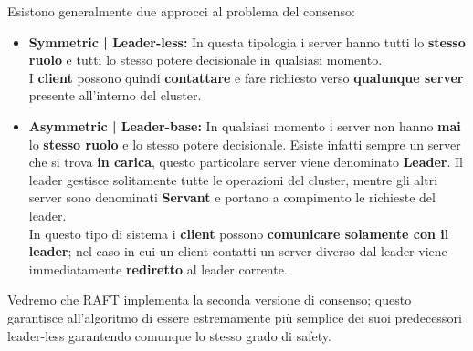 Esistono generalmente due approcci al problema del consenso:
\begin{itemize}
  \item{\textbf{Symmetric | Leader-less:}}
  In questa tipologia i server hanno tutti lo \textbf{stesso ruolo} e tutti lo stesso potere decisionale in qualsiasi momento.\\
  I \textbf{client} possono quindi \textbf{contattare} e fare richiesto verso \textbf{qualunque server} presente all'interno del cluster. 
  \item{\textbf{Asymmetric | Leader-base:}}
  In qualsiasi momento i server non hanno \textbf{mai} lo \textbf{stesso ruolo} e lo stesso potere decisionale. Esiste infatti sempre un server che si trova \textbf{in carica}, questo particolare server viene denominato \textbf{Leader}. Il leader gestisce solitamente tutte le operazioni del cluster, mentre gli altri server sono denominati \textbf{Servant} e portano a compimento le richieste del leader.\\
  In questo tipo di sistema i \textbf{client} possono \textbf{comunicare solamente con il leader}; nel caso in cui un client contatti un server diverso dal leader viene immediatamente \textbf{rediretto} al leader corrente.
\end{itemize}
Vedremo che RAFT implementa la seconda versione di consenso; questo garantisce all'algoritmo di essere estremamente più semplice dei suoi predecessori leader-less garantendo comunque lo stesso grado di safety.